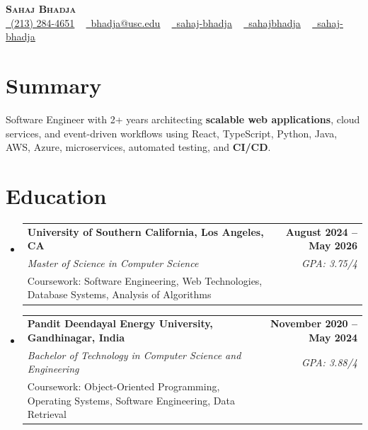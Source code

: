 \documentclass[letterpaper,10pt]{article}
\makeatletter
\newcommand{\sectionGap}{\vspace{-8pt}}
\newcommand{\resumeEduSubheading}[5]{\vspace{-1pt}\item\begin{tabular*}{1.0\textwidth}[t]{l@{\extracolsep{\fill}}r}\textbf{#1} & \textbf{\small #2} \\\textit{\small #3} & \textit{\small #4} \\\small #5 & \\\end{tabular*}\vspace{-4pt}}
\newcommand{\resumeSubHeadingListStart}{\begin{itemize}[leftmargin=0.0in, label={}]}
\newcommand{\resumeSubHeadingListEnd}{\end{itemize}}
\makeatother
\begin{document}
\begin{center}
{\Huge \scshape \textbf{Sahaj Bhadja}} \\ \vspace{1pt}
\small \href{tel:2132844651}{\faPhone\ \underline{(213) 284-4651}} ~ \href{mailto:bhadja@usc.edu}{\raisebox{-0.2\height}\faEnvelope\ \underline{bhadja@usc.edu}} ~
\href{https://www.linkedin.com/in/sahaj-bhadja/}{\raisebox{-0.2\height}\faLinkedin\ \underline{sahaj-bhadja}} ~ \href{https://github.com/SAHAJ-BHADJA}{\raisebox{-0.2\height}\faGithub\ \underline{sahajbhadja}} ~
\href{https://sahaj-bhadja.vercel.app/}{\raisebox{-0.2\height}\faGlobe\ \underline{sahaj-bhadja}}
\end{center}
\vspace{-16pt}
\section{Summary}
\begin{itemize}[leftmargin=0.15in, label={}]
\small{\item{Software Engineer with 2+ years architecting \textbf{scalable web applications}, cloud services, and event-driven workflows using React, TypeScript, Python, Java, AWS, Azure, microservices, automated testing, and \textbf{CI/CD}.}}
\end{itemize}
\sectionGap
\section{Education}
\resumeSubHeadingListStart
\resumeEduSubheading{University of Southern California, Los Angeles, CA}{August 2024 -- May 2026}{Master of Science in Computer Science}{GPA: 3.75/4}{Coursework: Software Engineering, Web Technologies, Database Systems, Analysis of Algorithms}
\resumeEduSubheading{Pandit Deendayal Energy University, Gandhinagar, India}{November 2020 -- May 2024}{Bachelor of Technology in Computer Science and Engineering}{GPA: 3.88/4}{Coursework: Object-Oriented Programming, Operating Systems, Software Engineering, Data Retrieval}
\resumeSubHeadingListEnd
\sectionGap
\end{document}
